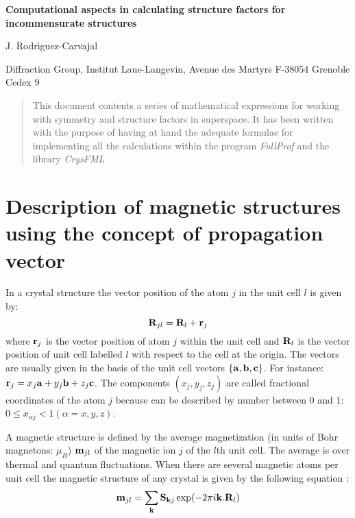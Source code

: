 \documentclass[10pt]{article}
\begin{document}
	
	\begin{center}
		
		{\huge {\bf Computational aspects in calculating structure factors for incommensurate structures }}
		
		
		\vskip5mm
		
		{\large J. Rodr\'{\i}guez-Carvajal}
		
		
		{Diffraction Group, Institut Laue-Langevin, Avenue des Martyrs F-38054 Grenoble Cedex 9}
		
 \end{center}
		
\begin{abstract}	
	This document contents a series of mathematical expressions for working with symmetry and structure factors in superspace. It has been written with the purpose of having at hand the adequate formulae for implementing all the calculations within the program {\it FullProf} and the library {\it CrysFML} 
\end{abstract}


\section{Description of magnetic structures using the concept of propagation vector}
\label{sec4}

In a crystal structure the vector position of the atom $j$ in the unit cell $l$ is given by:
\begin{equation}
\label{eq_apos}
 {\bf R}_{jl}={\bf R}_{l}+ {\bf r}_{j}
\end{equation}
where ${\bf r}_{j}$ is the vector position of atom $j$ within the unit cell and ${\bf R}_{l}$ is the vector position of unit cell labelled $l$ with respect to the cell at the origin. The vectors are usually given in the basis of the unit cell vectors $\{ {\bf a},{\bf b},{\bf c}\}$. For instance: $ {\bf r}_{j}=x_j{\bf a}+y_j{\bf b}+z_j{\bf c}$. The components $(x_j,y_j,z_j)$ are called fractional coordinates of the atom $j$ because can be described by number between $0$ and $1$: $0 \leq x_{\alpha j} < 1 (\alpha = x,y,z)$.

A magnetic structure is defined by the average magnetization (in units of Bohr magnetons: $\mu_B$) ${\bf m}_{jl}$ of the  magnetic ion $j$ of the $l$th unit cell. The average is over thermal and quantum fluctuations.
When there are several magnetic atoms per unit cell the magnetic structure of any crystal is given by the following equation \cite{JRC_Bouree}:
\begin{equation}
\label{eq_fourier_a}
{\bf m}_{jl} = \sum\limits_{\bf k} {\bf S}_{{\bf k}j} \exp(- 2\pi i {\bf k}. {\bf R}_l)
\end{equation}
\end{document}
